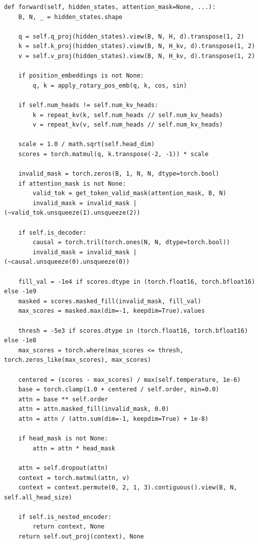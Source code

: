 \begin{lstlisting}
def forward(self, hidden_states, attention_mask=None, ...):
    B, N, _ = hidden_states.shape
    
    q = self.q_proj(hidden_states).view(B, N, H, d).transpose(1, 2)
    k = self.k_proj(hidden_states).view(B, N, H_kv, d).transpose(1, 2)
    v = self.v_proj(hidden_states).view(B, N, H_kv, d).transpose(1, 2)
    
    if position_embeddings is not None:
        q, k = apply_rotary_pos_emb(q, k, cos, sin)
    
    if self.num_heads != self.num_kv_heads:
        k = repeat_kv(k, self.num_heads // self.num_kv_heads)
        v = repeat_kv(v, self.num_heads // self.num_kv_heads)
    
    scale = 1.0 / math.sqrt(self.head_dim)
    scores = torch.matmul(q, k.transpose(-2, -1)) * scale
    
    invalid_mask = torch.zeros(B, 1, N, N, dtype=torch.bool)
    if attention_mask is not None:
        valid_tok = get_token_valid_mask(attention_mask, B, N)
        invalid_mask = invalid_mask | (~valid_tok.unsqueeze(1).unsqueeze(2))
    
    if self.is_decoder:
        causal = torch.tril(torch.ones(N, N, dtype=torch.bool))
        invalid_mask = invalid_mask | (~causal.unsqueeze(0).unsqueeze(0))
    
    fill_val = -1e4 if scores.dtype in (torch.float16, torch.bfloat16) else -1e9
    masked = scores.masked_fill(invalid_mask, fill_val)
    max_scores = masked.max(dim=-1, keepdim=True).values
    
    thresh = -5e3 if scores.dtype in (torch.float16, torch.bfloat16) else -1e8
    max_scores = torch.where(max_scores <= thresh, torch.zeros_like(max_scores), max_scores)
    
    centered = (scores - max_scores) / max(self.temperature, 1e-6)
    base = torch.clamp(1.0 + centered / self.order, min=0.0)
    attn = base ** self.order
    attn = attn.masked_fill(invalid_mask, 0.0)
    attn = attn / (attn.sum(dim=-1, keepdim=True) + 1e-8)
    
    if head_mask is not None:
        attn = attn * head_mask
    
    attn = self.dropout(attn)
    context = torch.matmul(attn, v)
    context = context.permute(0, 2, 1, 3).contiguous().view(B, N, self.all_head_size)
    
    if self.is_nested_encoder:
        return context, None
    return self.out_proj(context), None
\end{lstlisting}

